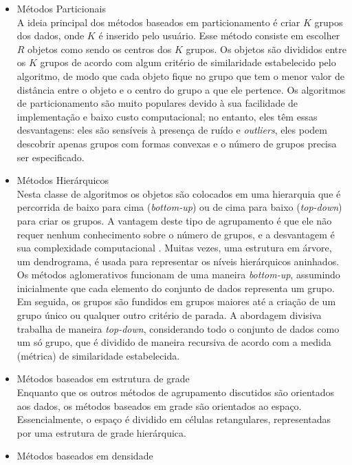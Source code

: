 \begin{itemize}
	\item Métodos Particionais\\
        A ideia principal dos métodos baseados em particionamento é criar ${K}$ grupos dos dados, onde ${K}$ é inserido pelo usuário.
        Esse método consiste em escolher ${R}$ objetos como sendo os centros dos ${K}$ grupos.
        Os objetos são divididos entre os ${K}$ grupos de acordo com algum critério de similaridade
        estabelecido pelo algoritmo, de modo que cada objeto fique no grupo que tem o menor valor de
        distância entre o objeto e o centro do grupo a que ele pertence.
        Os algoritmos de particionamento são muito populares devido à sua facilidade de implementação e baixo custo computacional; no entanto, eles têm essas desvantagens: eles são sensíveis à presença de ruído e \textit{outliers}, eles podem descobrir apenas grupos com formas convexas e o número de grupos precisa ser especificado.
	\item Métodos Hierárquicos\\
        Nesta classe de algoritmos os objetos são colocados em uma hierarquia que é percorrida de baixo para cima (\textit{bottom-up}) ou de cima para baixo (\textit{top-down}) para criar os grupos. A vantagem deste tipo de agrupamento é que ele não requer nenhum conhecimento sobre o número de grupos, e a desvantagem é sua complexidade computacional \cite{Lin2004}. Muitas vezes, uma estrutura em árvore, um dendrograma, é usada para representar os níveis hierárquicos aninhados.
        Os métodos aglomerativos funcionam de uma maneira \textit{bottom-up},
        assumindo inicialmente que cada elemento do conjunto de dados representa um grupo. Em seguida, os grupos são fundidos em grupos maiores até a criação de um grupo único ou qualquer outro critério de parada.
        A abordagem divisiva trabalha de maneira \textit{top-down}, considerando todo o conjunto de dados como um só grupo, que é dividido de maneira recursiva de acordo com a medida (métrica) de similaridade estabelecida.
	\item Métodos baseados em estrutura de grade\\
        Enquanto que os outros métodos de agrupamento discutidos são orientados aos dados, os métodos baseados em grade são orientados ao espaço. Essencialmente, o espaço é dividido em células retangulares, representadas por uma estrutura de grade hierárquica.
	\item Métodos baseados em densidade\\

\end{itemize}
